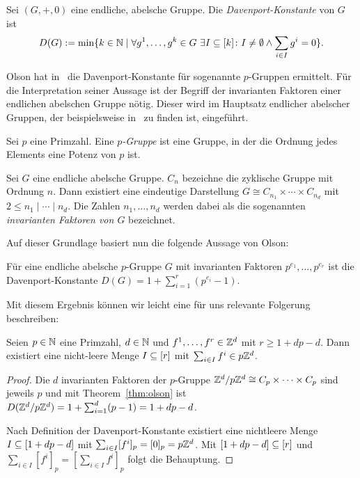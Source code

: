 \begin{definition}
	Sei $(G,+,0)$ eine endliche, abelsche Gruppe.
	Die {\em Davenport-Konstante} von $G$ ist
	$$
		D(G):=\min\{k\in\mathbb{N} \mid \forall g^1,\dots,g^k \in G~\exists I\subseteq[k]\colon I\neq\emptyset \wedge \sum_{i\in I}g^i=0  \} .
	$$
\end{definition}

Olson hat in~\cite{Olson1969} die Davenport-Konstante für sogenannte $p$-Gruppen ermittelt.
Für die Interpretation seiner Aussage ist der Begriff der invarianten Faktoren einer endlichen abelschen Gruppe nötig.
Dieser wird im Hauptsatz endlicher abelscher Gruppen, der beispielsweise in~\cite[Satz 10.6]{Karpfinger2017} zu finden ist, eingeführt.

\begin{definition}[$p$-Gruppe]
	Sei $p$ eine Primzahl.
	Eine \emph{$p$-Gruppe} ist eine Gruppe, in der die Ordnung jedes Elements eine Potenz von $p$ ist.
\end{definition}
\begin{theorem}
	Sei $G$ eine endliche abelsche Gruppe.
	$C_n$ bezeichne die zyklische Gruppe mit Ordnung $n$.
	Dann existiert eine eindeutige Darstellung $G\cong C_{n_1}\times\cdots\times C_{n_d}$ mit $2\leq n_1\mid\cdots\mid n_d$.
	Die Zahlen $n_1,\dots,n_d$ werden dabei als die sogenannten \emph{invarianten Faktoren von $G$} bezeichnet.
\end{theorem}

Auf dieser Grundlage basiert nun die folgende Aussage von Olson:

\begin{theorem}[Olson, 1969]\label{thm:olson}
	Für eine endliche abelsche $p$-Gruppe $G$ mit invarianten Faktoren $p^{e_1},\dots,p^{e_r}$ ist die Davenport-Konstante $D(G)=1+\sum_{i=1}^r(p^{e_i}-1)$.
\end{theorem}

Mit diesem Ergebnis können wir leicht eine für uns relevante Folgerung beschreiben:

\begin{corollary}\label{cor:olson}
	Seien $p\in\mathbb{N}$ eine Primzahl, $d\in\mathbb{N}$ und $f^1,\dots,f^r\in\mathbb{Z}^d$ mit $r\geq 1+dp-d$.
	Dann existiert eine nicht-leere Menge $I\subseteq[r]$ mit $\sum_{i\in I}f^i\in p\mathbb{Z}^d$.
\end{corollary}
\begin{proof}
	Die $d$ invarianten Faktoren der $p$-Gruppe $\mathbb{Z}^d/p\mathbb{Z}^d\cong C_p\times\dots\times C_p$ sind jeweils $p$ und mit Theorem~\ref{thm:olson} ist $D(\mathbb{Z}^d/p\mathbb{Z}^d)=1+\sum_{i=1}^d(p-1)=1+dp-d$.
	
	Nach Definition der Davenport-Konstante existiert eine nichtleere Menge $I\subseteq[1+dp-d]$ mit $\sum_{i\in I}[f^i]_p=[0]_p=p\mathbb{Z}^d$.
	Mit $[1+dp-d]\subseteq[r]$ und $\sum_{i\in I}[f^i]_p=[\sum_{i\in I}f^i]_p$ folgt die Behauptung.
\end{proof}

